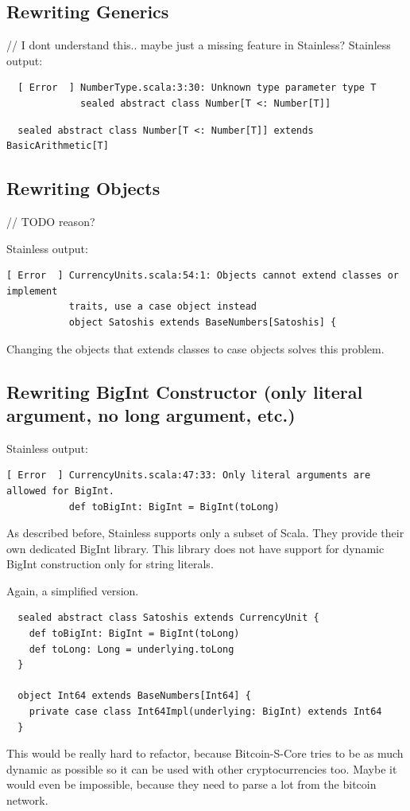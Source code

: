 \subsection{Rewriting Generics}
// I dont understand this.. maybe just a missing feature in Stainless?
Stainless output:
\begin{lstlisting}
  [ Error  ] NumberType.scala:3:30: Unknown type parameter type T
             sealed abstract class Number[T <: Number[T]]

\end{lstlisting}

\begin{lstlisting}
  sealed abstract class Number[T <: Number[T]] extends BasicArithmetic[T]  
\end{lstlisting}

\subsection{Rewriting Objects}
// TODO reason?

Stainless output:
\begin{lstlisting}
[ Error  ] CurrencyUnits.scala:54:1: Objects cannot extend classes or implement
           traits, use a case object instead
           object Satoshis extends BaseNumbers[Satoshis] {
\end{lstlisting}
Changing the objects that extends classes to case objects solves this problem.

\subsection{Rewriting BigInt Constructor (only literal argument, no long argument, etc.)}
Stainless output:
\begin{lstlisting}
[ Error  ] CurrencyUnits.scala:47:33: Only literal arguments are allowed for BigInt.
           def toBigInt: BigInt = BigInt(toLong)
\end{lstlisting}
As described before, Stainless supports only a subset of Scala.
They provide their own dedicated BigInt library.
This library does not have support for dynamic BigInt construction only for string literals.

Again, a simplified version.
\begin{lstlisting}
  sealed abstract class Satoshis extends CurrencyUnit {
    def toBigInt: BigInt = BigInt(toLong)
    def toLong: Long = underlying.toLong
  }

  object Int64 extends BaseNumbers[Int64] {
    private case class Int64Impl(underlying: BigInt) extends Int64
  }
\end{lstlisting}
This would be really hard to refactor, because Bitcoin-S-Core tries to be as much dynamic as possible so it can be used with other cryptocurrencies too.
Maybe it would even be impossible, because they need to parse a lot from the bitcoin network.

